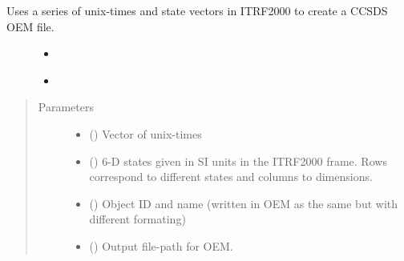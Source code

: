 \documentclass[letterpaper,10pt,english]{sphinxmanual}
\begin{document}

\begin{fulllineitems}
\label{\detokenize{modules/ccsds_write:ccsds_write.write_oem}}
Uses a series of unix-times and state vectors in ITRF2000 to create a CCSDS OEM file.
\begin{description}
\item[{}] \leavevmode\begin{itemize}
\item {} 
{\hyperref[\detokenize{modules/ccsds_write:ccsds_write.unix2datestrf}]{}}

\item {} 
{\hyperref[\detokenize{modules/ccsds_write:ccsds_write.unix2datestr}]{}}

\end{itemize}

\end{description}
\begin{quote}\begin{description}
\item[{Parameters}] \leavevmode\begin{itemize}
\item {} 
 () \textendash{} Vector of unix-times

\item {} 
 () \textendash{} 6-D states given in SI units in the ITRF2000 frame. Rows correspond to different states and columns to dimensions.

\item {} 
 () \textendash{} Object ID and name (written in OEM as the same but with different formating)

\item {} 
 () \textendash{} Output file-path for OEM.

\end{itemize}

\end{description}\end{quote}

\end{fulllineitems}
\end{document}
